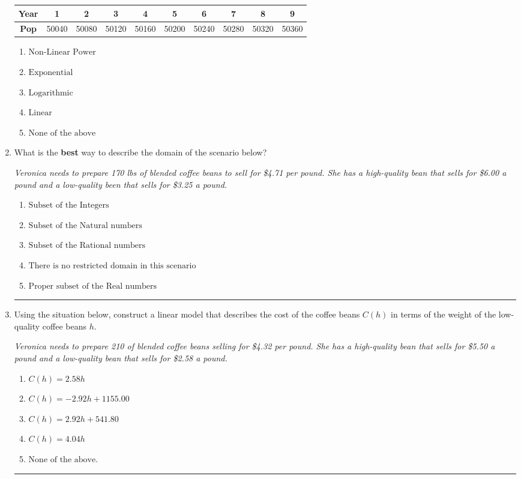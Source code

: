 \documentclass[14pt]{extbook}
\newcommand{\litem}[1]{\item#1\hspace*{-1cm}\rule{\textwidth}{0.4pt}}
\begin{document}
\begin{enumerate}
{\begin{tabular}{c|c|c|c|c|c|c|c|c|c}
\textbf{Year} &1 &2 &3 &4 &5 &6 &7 &8 &9\tabularnewline \hline
\textbf{Pop} &50040 &50080 &50120 &50160 &50200 &50240 &50280 &50320 &50360\end{tabular}\begin{enumerate}[label=\Alph*.]
\item \( \text{Non-Linear Power} \)
\item \( \text{Exponential} \)
\item \( \text{Logarithmic} \)
\item \( \text{Linear} \)
\item \( \text{None of the above} \)

\end{enumerate} }
\litem{
What is the \textbf{best} way to describe the domain of the scenario below?
\begin{center}
    \textit{ Veronica needs to prepare 170 lbs of blended coffee beans to sell for \$4.71 per pound. She has a high-quality bean that sells for \$6.00 a pound and a low-quality been that sells for \$3.25 a pound. }
\end{center}
\begin{enumerate}[label=\Alph*.]
\item \( \text{Subset of the Integers} \)
\item \( \text{Subset of the Natural numbers} \)
\item \( \text{Subset of the Rational numbers} \)
\item \( \text{There is no restricted domain in this scenario} \)
\item \( \text{Proper subset of the Real numbers} \)

\end{enumerate} }
\litem{
Using the situation below, construct a linear model that describes the cost of the coffee beans $C(h)$ in terms of the weight of the low-quality coffee beans $h$.
\begin{center}
    \textit{ Veronica needs to prepare 210 of blended coffee beans selling for \$4.32 per pound. She has a high-quality bean that sells for \$5.50 a pound and a low-quality bean that sells for \$2.58 a pound. }
\end{center}
\begin{enumerate}[label=\Alph*.]
\item \( C(h) = 2.58 h \)
\item \( C(h) = -2.92 h + 1155.00 \)
\item \( C(h) = 2.92 h + 541.80 \)
\item \( C(h) = 4.04 h \)
\item \( \text{None of the above.} \)


\end{enumerate}}
\end{enumerate}
\end{document}
